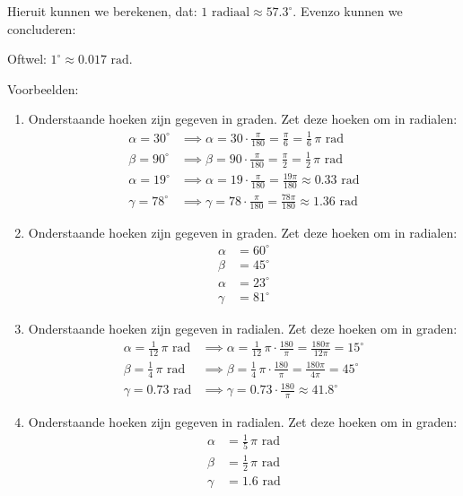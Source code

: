 Hieruit kunnen we berekenen, dat: $1 \text{ radiaal} \approx 57.3^\circ$. Evenzo kunnen we concluderen:

Oftwel: $1^\circ \approx  0.017 \text{ rad}$.

Voorbeelden:
\begin{enumerate}
    \itemsep1em
    \item Onderstaande hoeken zijn gegeven in graden. Zet deze hoeken om in radialen:
    \begin{align*}
    \alpha = 30^\circ &\implies \alpha = 30 \cdot \frac{\pi}{180} = \frac{\pi}{6} = \tfrac{1}{6}\,\pi \text{ rad} \\[0.5em]
    \beta = 90^\circ &\implies \beta = 90 \cdot \frac{\pi}{180} = \frac{\pi}{2} = \tfrac{1}{2}\,\pi \text{ rad} \\[0.5em]
    \alpha = 19^\circ &\implies \alpha = 19 \cdot \frac{\pi}{180} = \frac{19\pi}{180} \approx 0.33 \text{ rad} \\[0.5em]
    \gamma = 78^\circ &\implies \gamma = 78 \cdot \frac{\pi}{180} = \frac{78\pi}{180} \approx 1.36 \text{ rad}
    \end{align*}

    \item Onderstaande hoeken zijn gegeven in graden. Zet deze hoeken om in radialen:
    \begin{align*}
        \alpha &=60^\circ \\
        \beta  &=45^\circ \\
        \alpha &=23^\circ \\
        \gamma &=81^\circ
    \end{align*}

    \item Onderstaande hoeken zijn gegeven in radialen. Zet deze hoeken om in graden:
    \begin{align*}
    \alpha = \tfrac{1}{12}\,\pi \text{ rad} &\implies \alpha = \tfrac{1}{12}\,\pi \cdot \frac{180}{\pi} = \frac{180\pi}{12\pi} = 15^\circ \\[0.5em]
    \beta = \tfrac{1}{4}\,\pi \text{ rad} &\implies \beta = \tfrac{1}{4}\,\pi \cdot \frac{180}{\pi} = \frac{180\pi}{4\pi} = 45^\circ \\[0.5em]
    \gamma = 0.73 \text{ rad} &\implies \gamma = 0.73 \cdot \frac{180}{\pi} \approx 41.8^\circ
    \end{align*}

    \item Onderstaande hoeken zijn gegeven in radialen. Zet deze hoeken om in graden:
    \begin{align*}
    \alpha &= \tfrac{1}{5}\,\pi \text{ rad} \\[0.5em]
    \beta &= \tfrac{1}{2}\,\pi \text{ rad} \\[0.5em]
    \gamma &= 1.6 \text{ rad}
    \end{align*}
\end{enumerate}

